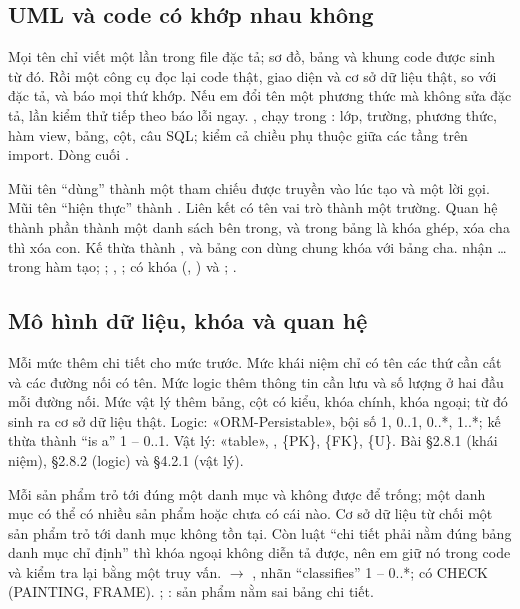 \subsection{UML và code có khớp nhau không}
{Mọi tên chỉ viết một lần trong file đặc tả; sơ đồ, bảng và khung code được sinh từ đó. Rồi một công cụ đọc lại code thật, giao diện và cơ sở dữ liệu thật, so với đặc tả, và báo mọi thứ khớp. Nếu em đổi tên một phương thức mà không sửa đặc tả, lần kiểm thử tiếp theo báo lỗi ngay.}
{, chạy trong : \factCheckClasses{} lớp, \factCheckFields{} trường, \factCheckOps{} phương thức, \factCheckViews{} hàm view, \factCheckTables{} bảng, \factCheckColumns{} cột, \factCheckSql{} câu SQL; kiểm cả chiều phụ thuộc giữa các tầng trên import. Dòng cuối .}

{Mũi tên ``dùng'' thành một tham chiếu được truyền vào lúc tạo và một lời gọi. Mũi tên ``hiện thực'' thành . Liên kết có tên vai trò thành một trường. Quan hệ thành phần thành một danh sách bên trong, và trong bảng là khóa ghép, xóa cha thì xóa con. Kế thừa thành , và bảng con dùng chung khóa với bảng cha.}
{ nhận \ldots{} trong hàm tạo; ; , ;  có khóa (, ) và ; .}

\subsection{Mô hình dữ liệu, khóa và quan hệ}
{Mỗi mức thêm chi tiết cho mức trước. Mức khái niệm chỉ có tên các thứ cần cất và các đường nối có tên. Mức logic thêm thông tin cần lưu và số lượng ở hai đầu mỗi đường nối. Mức vật lý thêm bảng, cột có kiểu, khóa chính, khóa ngoại; từ đó sinh ra cơ sở dữ liệu thật.}
{Logic: «ORM-Persistable», bội số 1, 0..1, 0..*, 1..*; kế thừa thành ``is a'' 1 -- 0..1. Vật lý: «table», , \{PK\}, \{FK\}, \{U\}. Bài §2.8.1 (khái niệm), §2.8.2 (logic) và §4.2.1 (vật lý).}

{Mỗi sản phẩm trỏ tới đúng một danh mục và không được để trống; một danh mục có thể có nhiều sản phẩm hoặc chưa có cái nào. Cơ sở dữ liệu từ chối một sản phẩm trỏ tới danh mục không tồn tại. Còn luật ``chi tiết phải nằm đúng bảng danh mục chỉ định'' thì khóa ngoại không diễn tả được, nên em giữ nó trong code và kiểm tra lại bằng một truy vấn.}
{  $\to$ , nhãn ``classifies'' 1 -- 0..*;  có CHECK (PAINTING, FRAME). ; : \factMisplaced{} sản phẩm nằm sai bảng chi tiết.}

